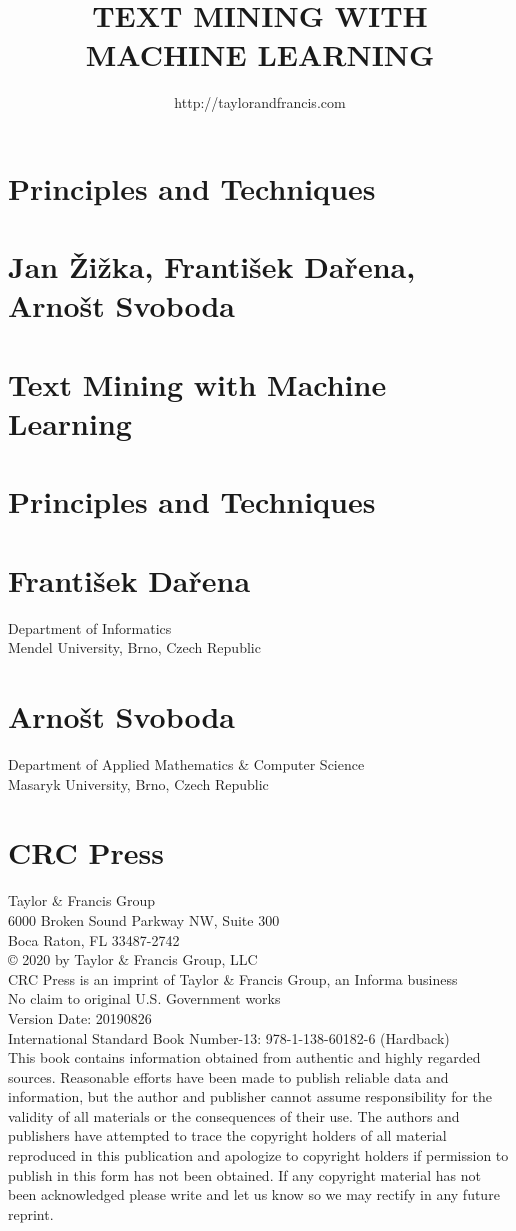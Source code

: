 \documentclass[10pt]{book}
\title{TEXT MINING WITH MACHINE LEARNING }
\author{http://taylorandfrancis.com}
\date{}
\begin{document}
\maketitle
\captionsetup{singlelinecheck=false}
\section*{Principles and Techniques}


\section*{Jan Žižka, František Dařena, Arnošt Svoboda }
\section*{Text Mining with Machine Learning }
\section*{Principles and Techniques}


\section*{František Dařena}
Department of Informatics\\
Mendel University, Brno, Czech Republic

\section*{Arnošt Svoboda}
Department of Applied Mathematics \& Computer Science\\
Masaryk University, Brno, Czech Republic

\section*{CRC Press}
Taylor \& Francis Group\\
6000 Broken Sound Parkway NW, Suite 300\\
Boca Raton, FL 33487-2742\\
© 2020 by Taylor \& Francis Group, LLC\\
CRC Press is an imprint of Taylor \& Francis Group, an Informa business\\
No claim to original U.S. Government works\\
Version Date: 20190826\\
International Standard Book Number-13: 978-1-138-60182-6 (Hardback)\\
This book contains information obtained from authentic and highly regarded sources. Reasonable efforts have been made to publish reliable data and information, but the author and publisher cannot assume responsibility for the validity of all materials or the consequences of their use. The authors and publishers have attempted to trace the copyright holders of all material reproduced in this publication and apologize to copyright holders if permission to publish in this form has not been obtained. If any copyright material has not been acknowledged please write and let us know so we may rectify in any future reprint.
\end{document}
